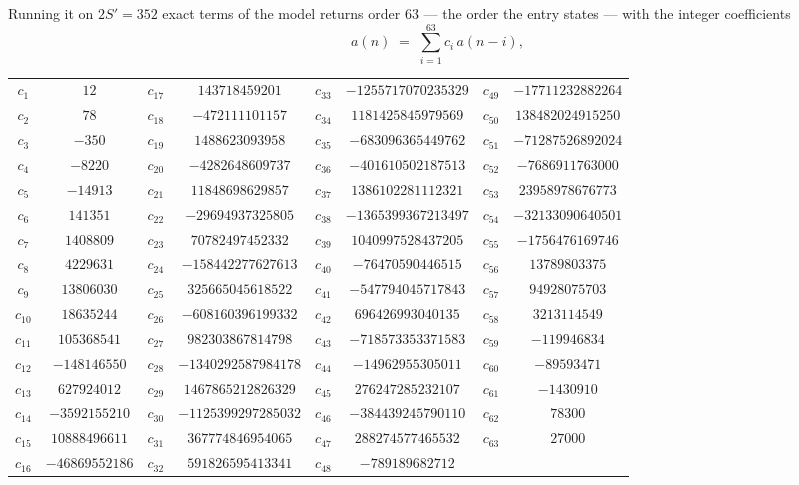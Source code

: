 \documentclass[11pt,a4paper]{article}
\theoremstyle{plain}
\theoremstyle{definition}
\begin{document}
Running it on $2S'=352$ exact terms of the model returns order $63$ --- the order the
entry states --- with the integer coefficients
\[
a(n)\;=\;\sum_{i=1}^{63}c_i\,a(n-i),
\]
\begin{center}\small
\begin{tabular}{cccccccc}
$c_{1}$ & $12$ & $c_{17}$ & $143718459201$ & $c_{33}$ & $-1255717070235329$ & $c_{49}$ & $-17711232882264$ \\
$c_{2}$ & $78$ & $c_{18}$ & $-472111101157$ & $c_{34}$ & $1181425845979569$ & $c_{50}$ & $138482024915250$ \\
$c_{3}$ & $-350$ & $c_{19}$ & $1488623093958$ & $c_{35}$ & $-683096365449762$ & $c_{51}$ & $-71287526892024$ \\
$c_{4}$ & $-8220$ & $c_{20}$ & $-4282648609737$ & $c_{36}$ & $-401610502187513$ & $c_{52}$ & $-7686911763000$ \\
$c_{5}$ & $-14913$ & $c_{21}$ & $11848698629857$ & $c_{37}$ & $1386102281112321$ & $c_{53}$ & $23958978676773$ \\
$c_{6}$ & $141351$ & $c_{22}$ & $-29694937325805$ & $c_{38}$ & $-1365399367213497$ & $c_{54}$ & $-32133090640501$ \\
$c_{7}$ & $1408809$ & $c_{23}$ & $70782497452332$ & $c_{39}$ & $1040997528437205$ & $c_{55}$ & $-1756476169746$ \\
$c_{8}$ & $4229631$ & $c_{24}$ & $-158442277627613$ & $c_{40}$ & $-76470590446515$ & $c_{56}$ & $13789803375$ \\
$c_{9}$ & $13806030$ & $c_{25}$ & $325665045618522$ & $c_{41}$ & $-547794045717843$ & $c_{57}$ & $94928075703$ \\
$c_{10}$ & $18635244$ & $c_{26}$ & $-608160396199332$ & $c_{42}$ & $696426993040135$ & $c_{58}$ & $3213114549$ \\
$c_{11}$ & $105368541$ & $c_{27}$ & $982303867814798$ & $c_{43}$ & $-718573353371583$ & $c_{59}$ & $-119946834$ \\
$c_{12}$ & $-148146550$ & $c_{28}$ & $-1340292587984178$ & $c_{44}$ & $-14962955305011$ & $c_{60}$ & $-89593471$ \\
$c_{13}$ & $627924012$ & $c_{29}$ & $1467865212826329$ & $c_{45}$ & $276247285232107$ & $c_{61}$ & $-1430910$ \\
$c_{14}$ & $-3592155210$ & $c_{30}$ & $-1125399297285032$ & $c_{46}$ & $-384439245790110$ & $c_{62}$ & $78300$ \\
$c_{15}$ & $10888496611$ & $c_{31}$ & $367774846954065$ & $c_{47}$ & $288274577465532$ & $c_{63}$ & $27000$ \\
$c_{16}$ & $-46869552186$ & $c_{32}$ & $591826595413341$ & $c_{48}$ & $-789189682712$ &  &  \\
\end{tabular}
\end{center}
\end{document}
